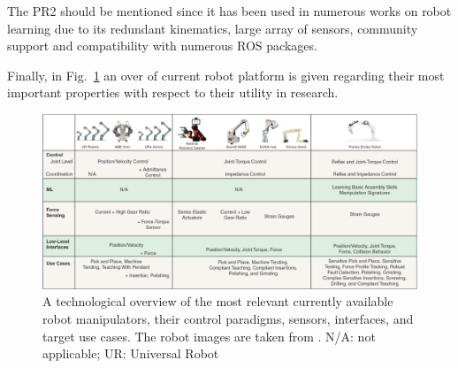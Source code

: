 The PR2 \cite{bohren2011towards} should be mentioned since it has been used in numerous works on robot learning due to its redundant kinematics, large array of sensors, community support and compatibility with numerous ROS packages.

Finally, in Fig.~\ref{fig:related:platforms:comparison} an over of current robot platform is given regarding their most important properties with respect to their utility in research.

\begin{figure}[ht!]
    \centering
    \includegraphics[angle=90,height=0.9\textheight]{figures/related_platforms_comp.png}
    \caption{A technological overview of the most relevant currently available robot manipulators, their control paradigms, sensors, interfaces, and target use cases. The robot images are
taken from \cite{Haddadin.2022,robotsur,robotsyumi,robotswam,robotsiiwa,robotssawyer,kreft2020inverse}. N/A: not applicable; UR: Universal Robot}
    \label{fig:related:platforms:comparison}
\end{figure}



